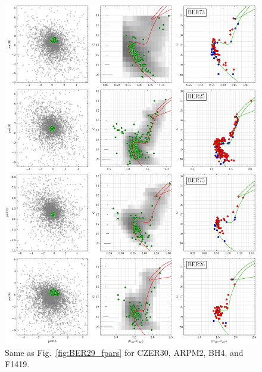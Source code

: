 \documentclass[draft]{aa}
\begin{document}
\begin{appendix}
 \begin{figure}
  \centering
  \includegraphics[height=.95\textheight]{figs/0_fpars.png}
  \caption{Same as Fig.~\ref{fig:BER29_fpars} for CZER30, ARPM2, BH4, and F1419.}
  \label{fig:8fpars}
 \end{figure}


\end{appendix}
\end{document}
